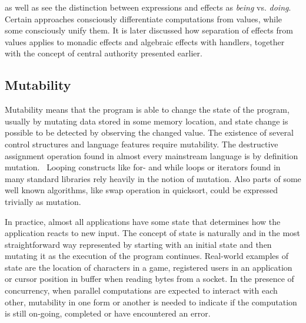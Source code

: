 \textcite{imperative-fp} as well as \textcite{do-be-do-be-do} see the distinction between expressions and effects as \textit{being} vs. \textit{doing}.  Certain approaches consciously differentiate computations from values, while some consciously unify them. It is later discussed how separation of effects from values applies to monadic effects and algebraic effects with handlers, together with the concept of central authority presented earlier.



\subsection{Mutability} %
Mutability means that the program is able to change the state of the program, usually by mutating data stored in some memory location, and state change is possible to be detected by observing the changed value. The existence of several control structures and language features require mutability. The destructive assignment operation found in almost every mainstream language is by definition mutation.~\cite[Chapter~3]{sicp} Looping constructs like for- and while loops or iterators found in many standard libraries rely heavily in the notion of mutation. Also parts of some well known algorithms, like swap operation in quicksort, could be expressed trivially as mutation.

In practice, almost all applications have some state that determines how the application reacts to new input. The concept of state is naturally and in the most straightforward way represented by starting with an initial state and then mutating it as the execution of the program continues. Real-world examples of state are the location of characters in a game, registered users in an application or cursor position in buffer when reading bytes from a socket. In the presence of concurrency, when parallel computations are expected to interact with each other, mutability in one form or another is needed to indicate if the computation is still on-going, completed or have encountered an error.



